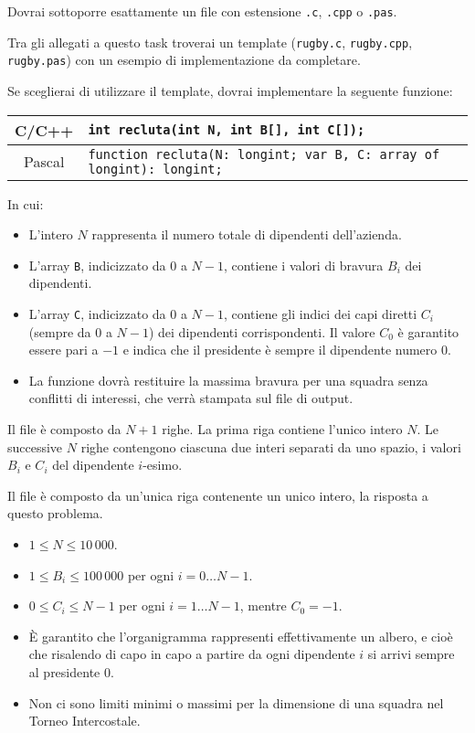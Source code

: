 \Implementation
Dovrai sottoporre esattamente un file con estensione \texttt{.c}, \texttt{.cpp} o \texttt{.pas}.

\begin{warning}
Tra gli allegati a questo task troverai un template (\texttt{rugby.c}, \texttt{rugby.cpp}, \texttt{rugby.pas}) con un esempio di implementazione da completare.
\end{warning}

Se sceglierai di utilizzare il template, dovrai implementare la seguente funzione:
\begin{center}\begin{tabularx}{\textwidth}{|c|X|}
\hline
C/C++  & \verb|int recluta(int N, int B[], int C[]);|\\
\hline
Pascal & \verb|function recluta(N: longint; var B, C: array of longint): longint;|\\
\hline
\end{tabularx}\end{center}
In cui:
\begin{itemize}[nolistsep]
  \item L'intero $N$ rappresenta il numero totale di dipendenti dell'azienda.
  \item L'array \texttt{B}, indicizzato da $0$ a $N-1$, contiene i valori di bravura $B_i$ dei dipendenti.
  \item L'array \texttt{C}, indicizzato da $0$ a $N-1$, contiene gli indici dei capi diretti $C_i$ (sempre da 0 a $N-1$) dei dipendenti corrispondenti. Il valore $C_0$ è garantito essere pari a $-1$ e indica che il presidente è sempre il dipendente numero $0$.
  \item La funzione dovrà restituire la massima bravura per una squadra senza conflitti di interessi, che verrà stampata sul file di output.
\end{itemize}

\InputFile
Il file  è composto da $N+1$ righe. La prima riga contiene l'unico intero $N$. Le successive $N$ righe contengono ciascuna due interi separati da uno spazio, i valori $B_i$ e $C_i$ del dipendente $i$-esimo.

\OutputFile
Il file \outputfile{} è composto da un'unica riga contenente un unico intero, la risposta a questo problema.

\Constraints
\begin{itemize}[nolistsep, itemsep=2mm]
	\item $1 \le N \le 10\,000$.
	\item $1 \le B_i \le 100\,000$ per ogni $i=0\ldots N-1$.
	\item $0 \le C_i \le N-1$ per ogni $i=1\ldots N-1$, mentre $C_0 = -1$.
	\item \`E garantito che l'organigramma rappresenti effettivamente un albero, e cioè che risalendo di capo in capo a partire da ogni dipendente $i$ si arrivi sempre al presidente $0$.
	\item Non ci sono limiti minimi o massimi per la dimensione di una squadra nel Torneo Intercostale.
\end{itemize}

